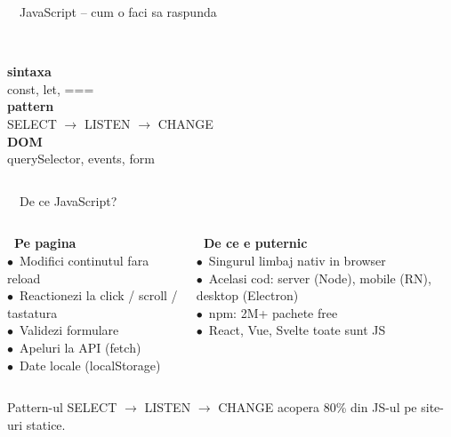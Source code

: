 \documentclass[aspectratio=169,11pt]{beamer}
\newcommand{\code}[1]{{\ttfamily\small\color{accent!85!black}#1}}
\begin{document}
\begin{frame}[c]{\textcolor{themeJs}{\faBolt}\ \ JavaScript -- cum o faci sa raspunda}
  \begin{columns}[T,onlytextwidth]
    \centering
    {\color{themeJs}\fontsize{60}{60}\selectfont\faTerminal}\\[16pt]
    {\Large\bfseries sintaxa}\\[4pt]
    {\small\color{textDim}const, let, ===}
    \centering
    {\color{themeJs}\fontsize{60}{60}\selectfont\faBullseye}\\[16pt]
    {\Large\bfseries pattern}\\[4pt]
    {\small\color{textDim}SELECT $\to$ LISTEN $\to$ CHANGE}
    \centering
    {\color{themeJs}\fontsize{60}{60}\selectfont\faMousePointer}\\[16pt]
    {\Large\bfseries DOM}\\[4pt]
    {\small\color{textDim}querySelector, events, form}
  \end{columns}
\end{frame}

\begin{frame}{\textcolor{themeJs}{\faBolt}\ \ De ce JavaScript?}
\vspace{14pt}
\begin{columns}[T,onlytextwidth]
  {\small\bfseries\color{themeJs}\faBolt\ Pe pagina}\\[6pt]
  {\footnotesize
  $\bullet$\ Modifici continutul fara reload\\[4pt]
  $\bullet$\ Reactionezi la click / scroll / tastatura\\[4pt]
  $\bullet$\ Validezi formulare\\[4pt]
  $\bullet$\ Apeluri la API (\code{fetch})\\[4pt]
  $\bullet$\ Date locale (\code{localStorage})
  }

  {\small\bfseries\color{themeJs}\faRocket\ De ce e puternic}\\[6pt]
  {\footnotesize
  $\bullet$\ Singurul limbaj nativ in browser\\[4pt]
  $\bullet$\ Acelasi cod: server (Node), mobile (RN), desktop (Electron)\\[4pt]
  $\bullet$\ \code{npm}: 2M+ pachete free\\[4pt]
  $\bullet$\ React, Vue, Svelte \textendash{} toate sunt JS
  }
\end{columns}

\vspace{18pt}
\begin{takeaway}
Pattern-ul SELECT $\to$ LISTEN $\to$ CHANGE acopera 80\% din JS-ul pe site-uri statice.
\end{takeaway}
\end{frame}
\end{document}
